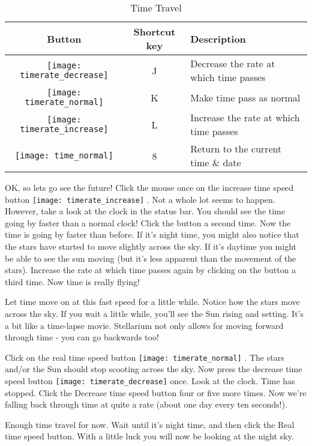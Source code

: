 \begin{table}[h]
\centering
\begin{tabular}{c c l}
\toprule
\textbf{Button} & \textbf{Shortcut key} & \textbf{Description}\\
\midrule
\texttt{[image: timerate\_decrease]} & J & Decrease the rate at which time passes \\
\texttt{[image: timerate\_normal]} & K & Make time pass as normal \\
\texttt{[image: timerate\_increase]} & L & Increase the rate at which time passes \\
\texttt{[image: time\_normal]} & 8 & Return to the current time \& date \\
\bottomrule
\end{tabular}
\caption{Time Travel}
\end{table}

OK, so lets go see the future! Click the mouse once on the increase time
speed button
\texttt{[image: timerate\_increase]}
. Not a whole lot seems to happen. However, take a look at the clock in
the status bar. You should see the time going by faster than a normal
clock! Click the button a second time. Now the time is going by faster
than before. If it's night time, you might also notice that the stars
have started to move slightly across the sky. If it's daytime you might
be able to see the sun moving (but it's less apparent than the movement
of the stars). Increase the rate at which time passes again by clicking
on the button a third time. Now time is really flying!

Let time move on at this fast speed for a little while. Notice how the
stars move across the sky. If you wait a little while, you'll see the
Sun rising and setting. It's a bit like a time-lapse movie. Stellarium
not only allows for moving forward through time - you can go backwards
too!

Click on the real time speed button
\texttt{[image: timerate\_normal]} .
The stars and/or the Sun should stop scooting across the sky. Now press
the decrease time speed button
\texttt{[image: timerate\_decrease]}
once. Look at the clock. Time has stopped. Click the Decrease time speed
button four or five more times. Now we're falling back through time at
quite a rate (about one day every ten seconds!).

Enough time travel for now. Wait until it's night time, and then click
the Real time speed button. With a little luck you will now be looking
at the night sky.

